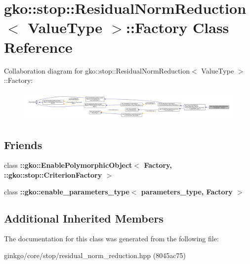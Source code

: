\hypertarget{classgko_1_1stop_1_1ResidualNormReduction_1_1Factory}{}\section{gko\+:\+:stop\+:\+:Residual\+Norm\+Reduction$<$ Value\+Type $>$\+:\+:Factory Class Reference}
\label{classgko_1_1stop_1_1ResidualNormReduction_1_1Factory}


Collaboration diagram for gko\+:\+:stop\+:\+:Residual\+Norm\+Reduction$<$ Value\+Type $>$\+:\+:Factory\+:
\nopagebreak
\begin{figure}[H]
\begin{center}
\leavevmode
\includegraphics[width=350pt]{classgko_1_1stop_1_1ResidualNormReduction_1_1Factory__coll__graph}
\end{center}
\end{figure}
\subsection*{Friends}
\begin{DoxyCompactItemize}
\item 
\mbox{\label{classgko_1_1stop_1_1ResidualNormReduction_1_1Factory_aaa5507cf00e5361a77971746fefa42e6}} 
class {\bfseries \+::gko\+::\+Enable\+Polymorphic\+Object$<$ Factory, \+::gko\+::stop\+::\+Criterion\+Factory $>$}
\item 
\mbox{\label{classgko_1_1stop_1_1ResidualNormReduction_1_1Factory_a0d176cbd42d6214e11aee8c30ca256fc}} 
class {\bfseries \+::gko\+::enable\+\_\+parameters\+\_\+type$<$ parameters\+\_\+type, Factory $>$}
\end{DoxyCompactItemize}
\subsection*{Additional Inherited Members}


The documentation for this class was generated from the following file\+:\begin{DoxyCompactItemize}
\item 
ginkgo/core/stop/residual\+\_\+norm\+\_\+reduction.\+hpp (8045ac75)\end{DoxyCompactItemize}
